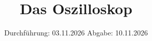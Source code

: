 




\subject{V300}
\title{Das Oszilloskop}
\date{%
  Durchführung: 03.11.2026
  \hspace{3em}
  Abgabe: 10.11.2026
}



\maketitle
\thispagestyle{empty}
\tableofcontents
\newpage

%

%
%
\clearpage
\printbibliography{}

%


